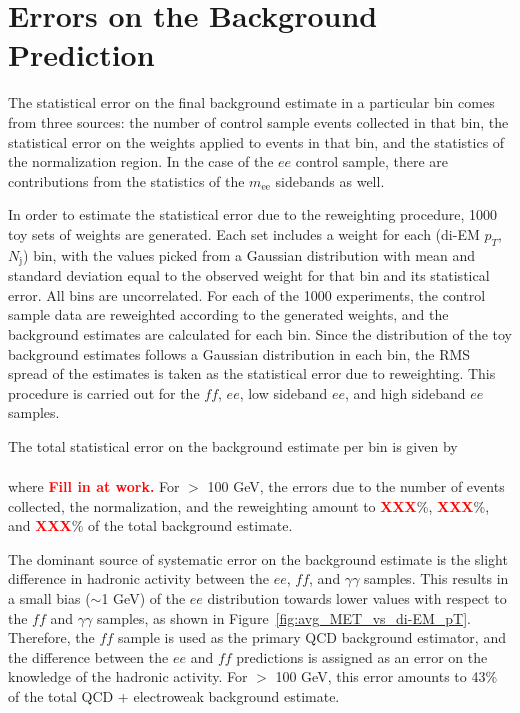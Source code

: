 \documentclass[dissertation.tex]{subfiles}
\begin{document}
\section{Errors on the Background Prediction}
\label{sec:Errors on the Background Prediction}

The statistical error on the final background estimate in a particular \MET bin comes from three sources: the number of control sample events collected in that bin, the statistical error on the weights applied to events in that bin, and the statistics of the normalization region.  In the case of the $ee$ control sample, there are contributions from the statistics of the $m_{\mathrm{ee}}$ sidebands as well.

In order to estimate the statistical error due to the reweighting procedure, 1000 toy sets of weights are generated.  Each set includes a weight for each (di-EM $p_{T}$, $N_{\mathrm{j}}$) bin, with the values picked from a Gaussian distribution with mean and standard deviation equal to the observed weight for that bin and its statistical error.  All bins are uncorrelated.  For each of the 1000 experiments, the control sample data are reweighted according to the generated weights, and the background estimates are calculated for each \MET bin.  Since the distribution of the toy background estimates follows a Gaussian distribution in each \MET bin, the RMS spread of the estimates is taken as the statistical error due to reweighting.  This procedure is carried out for the $\mathit{ff}$, $ee$, low sideband $ee$, and high sideband $ee$ samples.

The total statistical error on the background estimate per \MET bin is given by

\begin{eqnarray}
\end{eqnarray}
where \textcolor{red}{\textbf{Fill in at work.}}  For \MET $>$ 100 GeV, the errors due to the number of events collected, the normalization, and the reweighting amount to \textcolor{red}{\textbf{XXX}}\%, \textcolor{red}{\textbf{XXX}}\%, and \textcolor{red}{\textbf{XXX}}\% of the total background estimate.

The dominant source of systematic error on the background estimate is the slight difference in hadronic activity between the $ee$, $\mathit{ff}$, and $\gamma\gamma$ samples.  This results in a small bias ($\sim$1 GeV) of the $ee$ \MET distribution towards lower values with respect to the $\mathit{ff}$ and $\gamma\gamma$ samples, as shown in Figure~\ref{fig:avg_MET_vs_di-EM_pT}.  Therefore, the $\mathit{ff}$ sample is used as the primary QCD background estimator, and the difference between the $ee$ and $\mathit{ff}$ predictions is assigned as an error on the knowledge of the hadronic activity.  For \MET $>$ 100 GeV, this error amounts to 43\% of the total QCD + electroweak background estimate.
\end{document}
